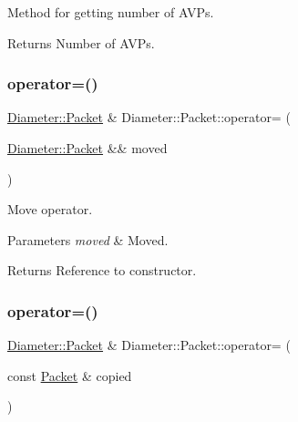 Method for getting number of A\+V\+Ps. 

\begin{DoxyReturn}{Returns}
Number of A\+V\+Ps. 
\end{DoxyReturn}
\mbox{\label{classDiameter_1_1Packet_a80abbedae208ece043c406a87b8876af}} 
\subsubsection{\texorpdfstring{operator=()}{operator=()}\hspace{0.1cm}{\footnotesize\ttfamily [1/2]}}
{\footnotesize\ttfamily \hyperlink{classDiameter_1_1Packet}{Diameter\+::\+Packet} \& Diameter\+::\+Packet\+::operator= (\begin{DoxyParamCaption}\item[{\hyperlink{classDiameter_1_1Packet}{Diameter\+::\+Packet} \&\&}]{moved }\end{DoxyParamCaption})\hspace{0.3cm}{\ttfamily [noexcept]}}



Move operator. 


\begin{DoxyParams}{Parameters}
{\em moved} & Moved. \\
\hline
\end{DoxyParams}
\begin{DoxyReturn}{Returns}
Reference to constructor. 
\end{DoxyReturn}
\mbox{\label{classDiameter_1_1Packet_a38f277e129b9b7d7e31188b48d947506}} 
\subsubsection{\texorpdfstring{operator=()}{operator=()}\hspace{0.1cm}{\footnotesize\ttfamily [2/2]}}
{\footnotesize\ttfamily \hyperlink{classDiameter_1_1Packet}{Diameter\+::\+Packet} \& Diameter\+::\+Packet\+::operator= (\begin{DoxyParamCaption}\item[{const \hyperlink{classDiameter_1_1Packet}{Packet} \&}]{copied }\end{DoxyParamCaption})}



